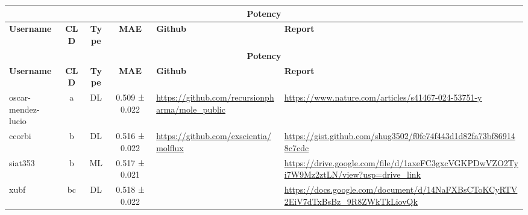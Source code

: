 \documentclass[journal=jcim,manuscript=suppinfo]{achemso}
\begin{document}

\newpage

{\tiny

\begin{longtable}{|p{2cm}|c|c|c|p{4cm}|p{6cm}|}
\hline
\multicolumn{6}{|c|}{\small{\textbf{Potency}}} \\
\hline
\textbf{Username} & \textbf{CLD} & \textbf{Type} & \textbf{MAE} & \textbf{Github} & \textbf{Report} \\

\hline
\endfirsthead

\hline
\multicolumn{6}{|c|}{\small{\textbf{Potency}}} \\
\hline
\textbf{Username} & \textbf{CLD} & \textbf{Type} & \textbf{MAE} & \textbf{Github} & \textbf{Report} \\
\hline
\endhead

\endfoot

oscar-mendez-lucio & a & DL & 0.509 ± 0.022 & \url{https://github.com/recursionpharma/mole_public} & \url{https://www.nature.com/articles/s41467-024-53751-y} \\
\hline

ccorbi & b & DL & 0.516 ± 0.022 & \url{https://github.com/exscientia/molflux} & \url{https://gist.github.com/shug3502/f0fe74f443d1d82fa73bf869148c7cdc} \\
\hline

siat353 & b & ML & 0.517 ± 0.021 & & \url{https://drive.google.com/file/d/1axeFC3gxcVGKPDwVZO2Tyi7W9Mz2ztLN/view?usp=drive_link} \\
\hline

xubf & bc & DL & 0.518 ± 0.022 & & \url{https://docs.google.com/document/d/14NaFXBsCToKCyRTV2EiV7dTxBsBz_9R8ZWkTkLiovQk} \\
\hline


\end{longtable}}
\end{document}
